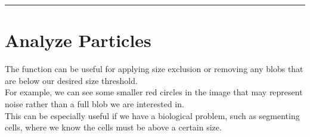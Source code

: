 \documentclass[letterpaper,10pt,english]{jupyterBook}
\begin{document}
\bigskip\hrule\bigskip



\section{Analyze Particles}
\label{\detokenize{basic-segmentation:analyze-particles}}
\sphinxAtStartPar
The  function can be useful for applying size exclusion or removing any blobs that are below our desired size threshold.\\
For example, we can see some smaller red circles in the image that may represent noise rather than a full blob we are interested in.\\
This can be especially useful if we have a biological problem, such as segmenting cells, where we know the cells must be above a certain size.
\end{document}
